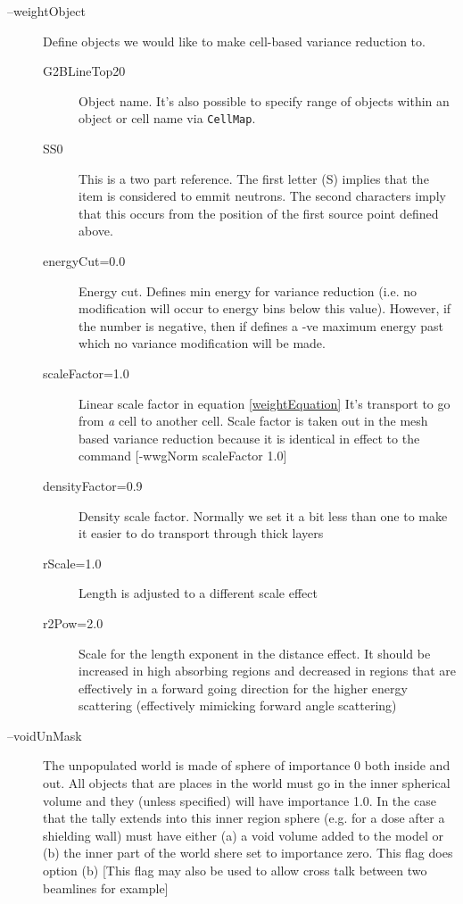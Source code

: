 \begin{description}
\begin{description}
\item[--weightObject] Define objects we would like to make cell-based variance reduction to.
  \begin{description}
  \item[G2BLineTop20] Object name. It's also possible to specify range of objects within an object or cell name via
    {\tt CellMap}.
  \item[SS0] This is a two part reference. The first letter (S) implies that the item is considered to emmit neutrons.
    The second characters imply that this occurs from the position of the first source point defined above.

  \item[energyCut=0.0] Energy cut. Defines min energy for variance reduction
    (i.e. no modification will occur to energy bins below this value). However, if the number is negative, then
    if defines a -ve maximum energy past which no variance modification will be made.

  \item[scaleFactor=1.0] Linear scale factor in equation \ref{weightEquation}
    It's transport to go from {\em a} cell to another cell.
    \alert{Scale factor is taken out in the mesh based variance reduction because it is identical in effect to the
      command [-wwgNorm scaleFactor 1.0] }

  \item[densityFactor=0.9] Density scale factor. Normally we set it a bit less than one to make it easier to do transport through thick layers
    
  \item[rScale=1.0] Length is adjusted to a different scale effect
    
  \item[r2Pow=2.0] Scale for the length exponent in the distance effect. It should be increased in high absorbing
    regions and decreased in regions that are effectively in a forward going direction for the higher energy scattering
    (effectively mimicking forward angle scattering)
    
  \end{description}

\item[--voidUnMask] The unpopulated world is made of sphere of importance 0 both inside and out.
  All objects that are places in the world must go in the inner spherical volume and they (unless specified) will have
  importance 1.0. In the case that the tally extends into this inner region sphere (e.g. for a dose after a
  shielding wall) must have either (a) a void volume added to the model or (b) the inner part of the world shere set
  to importance zero. This flag does option (b) [This flag may also be used to allow cross talk between two beamlines for
    example] 


\end{description}
\end{description}

